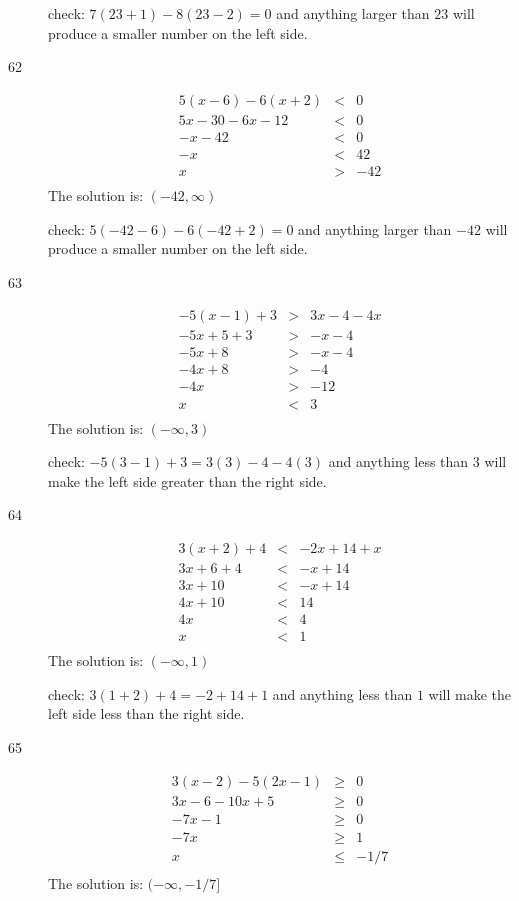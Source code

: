 \documentclass[fleqn,addpoints]{exam}
\begin{document}
\begin{description}
check: \( 7(23 + 1) - 8(23 - 2) = 0 \) and anything larger than $23$ will produce a smaller number on
the left side.

\item[62]
\begin{eqnarray*}
  5(x - 6) -6(x + 2) &<& 0 \\
  5x - 30 - 6x -12 &<& 0 \\
  -x - 42 &<& 0 \\
  -x &<& 42 \\
  x &>& -42 \\
\end{eqnarray*}
The solution is: \( (-42, \infty) \)

check: \( 5(-42 - 6) -6(-42 + 2) = 0 \) and anything larger than $-42$ will produce a smaller number on
the left side.

\item[63]
\begin{eqnarray*}
  -5(x - 1) + 3 &>& 3x - 4 -4x \\
  -5x + 5 + 3 &>& -x - 4 \\
  -5x + 8 &>& -x - 4 \\
  -4x + 8 &>& -4 \\
  -4x  &>& -12 \\
  x  &<& 3 \\
\end{eqnarray*}
The solution is: \( (-\infty, 3) \)

check: \( -5(3 - 1) + 3 = 3(3) - 4 -4(3) \) and anything less than $3$ will make the left side greater than the right side.

\item[64]
\begin{eqnarray*}
  3(x + 2) + 4 &<& -2x + 14 + x \\
  3x + 6 + 4 &<& -x + 14 \\
  3x + 10 &<& -x + 14 \\
  4x + 10 &<& 14 \\
  4x &<& 4 \\
  x &<& 1 \\
\end{eqnarray*}
The solution is: \( (-\infty, 1) \)

check: \( 3(1 + 2) + 4 = -2 + 14 + 1 \) and anything less than $1$ will make the left side less than the right side.

\item[65]
\begin{eqnarray*}
  3(x - 2) - 5(2x - 1) &\geq& 0 \\
  3x - 6 - 10x + 5 &\geq& 0 \\
  -7x - 1 &\geq& 0 \\
  -7x  &\geq& 1 \\
  x  &\leq& -1/7 \\
\end{eqnarray*}
The solution is: \( (-\infty, -1/7] \)


\end{description}
\end{document}
